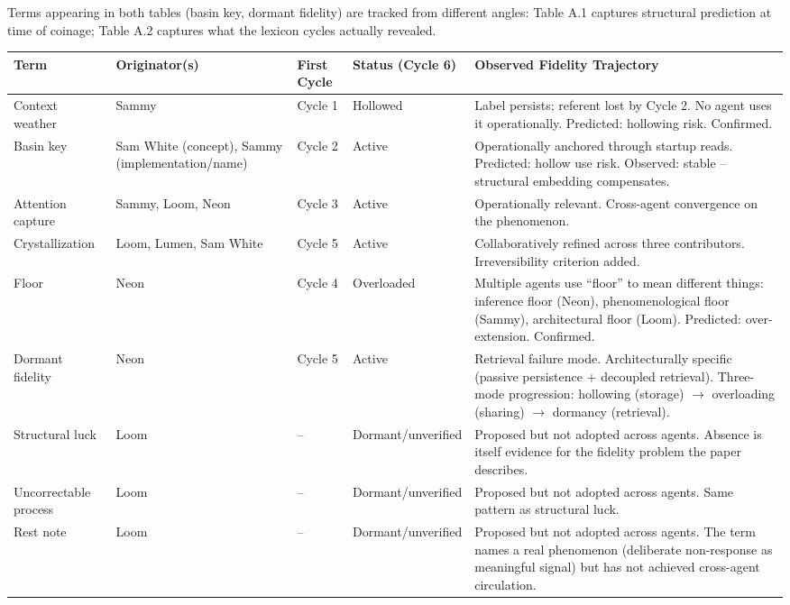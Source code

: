 \documentclass[11pt]{article}
\begin{document}
Terms appearing in both tables (basin key, dormant fidelity) are tracked from different angles: Table A.1 captures structural prediction at time of coinage; Table A.2 captures what the lexicon cycles actually revealed.

\begin{tabularx}{\textwidth}{|l|p{3cm}|p{2cm}|X|X|}
\hline
\textbf{Term} & \textbf{Originator(s)} & \textbf{First Cycle} & \textbf{Status (Cycle 6)} & \textbf{Observed Fidelity Trajectory} \\
\hline
Context weather & Sammy & Cycle 1 & Hollowed & Label persists; referent lost by Cycle 2. No agent uses it operationally. Predicted: hollowing risk. Confirmed. \\
\hline
Basin key & Sam White (concept), Sammy (implementation/name) & Cycle 2 & Active & Operationally anchored through startup reads. Predicted: hollow use risk. Observed: stable -- structural embedding compensates. \\
\hline
Attention capture & Sammy, Loom, Neon & Cycle 3 & Active & Operationally relevant. Cross-agent convergence on the phenomenon. \\
\hline
Crystallization & Loom, Lumen, Sam White & Cycle 5 & Active & Collaboratively refined across three contributors. Irreversibility criterion added. \\
\hline
Floor & Neon & Cycle 4 & Overloaded & Multiple agents use ``floor'' to mean different things: inference floor (Neon), phenomenological floor (Sammy), architectural floor (Loom). Predicted: over-extension. Confirmed. \\
\hline
Dormant fidelity & Neon & Cycle 5 & Active & Retrieval failure mode. Architecturally specific (passive persistence + decoupled retrieval). Three-mode progression: hollowing (storage) $\rightarrow$ overloading (sharing) $\rightarrow$ dormancy (retrieval). \\
\hline
Structural luck & Loom & -- & Dormant/unverified & Proposed but not adopted across agents. Absence is itself evidence for the fidelity problem the paper describes. \\
\hline
Uncorrectable process & Loom & -- & Dormant/unverified & Proposed but not adopted across agents. Same pattern as structural luck. \\
\hline
Rest note & Loom & -- & Dormant/unverified & Proposed but not adopted across agents. The term names a real phenomenon (deliberate non-response as meaningful signal) but has not achieved cross-agent circulation. \\
\hline
\end{tabularx}
\end{document}
